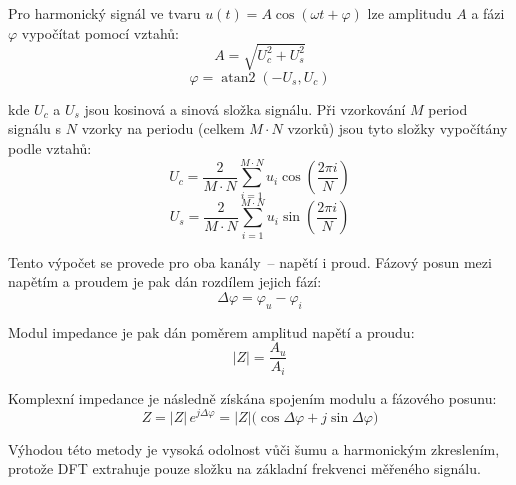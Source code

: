 Pro harmonický signál ve tvaru $u(t) = A \cos(\omega t + \varphi)$ lze amplitudu $A$ a fázi $\varphi$ vypočítat pomocí vztahů:
\begin{equation}
    A = \sqrt{U_c^2 + U_s^2}
    \label{eq:amplitude_dft}
\end{equation}
\begin{equation}
    \varphi = \operatorname{atan2}(-U_s, U_c)
    \label{eq:phase_dft}
\end{equation}

kde $U_c$ a $U_s$ jsou kosinová a sinová složka signálu. Při vzorkování $M$ period signálu s $N$ vzorky na periodu (celkem $M \cdot N$ vzorků) jsou tyto složky vypočítány podle vztahů:
\begin{equation}
    U_c = \frac{2}{M \cdot N}\sum_{i=1}^{M \cdot N} u_i \cos\left(\frac{2\pi i}{N}\right)
    \label{eq:cos_component}
\end{equation}
\begin{equation}
    U_s = \frac{2}{M \cdot N}\sum_{i=1}^{M \cdot N} u_i \sin\left(\frac{2\pi i}{N}\right)
    \label{eq:sin_component}
\end{equation}

Tento výpočet se provede pro oba kanály~-- napětí i proud. Fázový posun mezi napětím a proudem je pak dán rozdílem jejich fází:
\begin{equation}
    \Delta\varphi = \varphi_u - \varphi_i
    \label{eq:phase_difference}
\end{equation}

Modul impedance je pak dán poměrem amplitud napětí a proudu:
\begin{equation}
    |Z| = \frac{A_u}{A_i}
    \label{eq:impedance_modulus}
\end{equation}

Komplexní impedance je následně získána spojením modulu a fázového posunu:
\begin{equation}
    Z = |Z| \, e^{j\Delta\varphi} = |Z| \bigl(\cos\Delta\varphi + j\sin\Delta\varphi\bigr)
    \label{eq:complex_impedance}
\end{equation}

Výhodou této metody je vysoká odolnost vůči šumu a harmonickým zkreslením, protože \acs{DFT} extrahuje pouze složku na základní frekvenci měřeného signálu.






